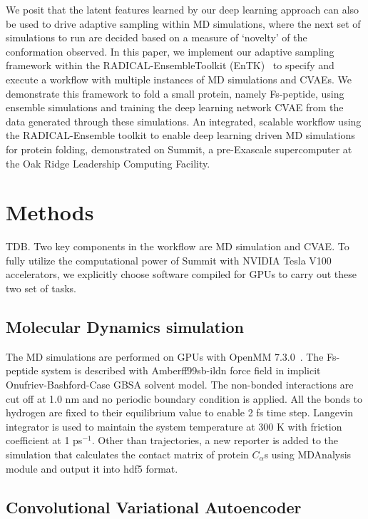 \documentclass[conference,final]{IEEEtran}
\begin{document}
We posit that the latent features learned by our deep learning approach can
also be used to drive adaptive sampling within MD simulations, where the next
set of simulations to run are decided based on a measure of ‘novelty’ of the
conformation observed. In this paper, we implement our adaptive sampling
framework within the RADICAL-EnsembleToolkit
(EnTK)~\cite{balasubramanian2018harnessing} to specify and execute a workflow
with multiple instances of MD simulations and CVAEs. We demonstrate this
framework to fold a small protein, namely Fs-peptide, using ensemble
simulations and training the deep learning network CVAE from the data
generated through these simulations. An integrated, scalable workflow using
the RADICAL-Ensemble toolkit to enable deep learning driven MD simulations
for protein folding, demonstrated on Summit, a pre-Exascale supercomputer at
the Oak Ridge Leadership Computing Facility.

\section{Methods} 

TDB\@. Two key components in the workflow are MD simulation and CVAE. 
To fully utilize the computational power of Summit with NVIDIA Tesla V100 
accelerators, we explicitly choose software compiled for GPUs to carry out 
these two set of tasks. 


\subsection{Molecular Dynamics simulation}

The MD simulations are performed on GPUs with OpenMM
7.3.0~\cite{eastman2017openmm}. The Fs-peptide system is described with 
Amberff99sb-ildn force field in implicit Onufriev-Bashford-Case GBSA solvent 
model. The non-bonded 
interactions are cut off at 1.0 nm and no periodic boundary condition is
applied. All the bonds to hydrogen are fixed to their equilibrium value to
enable 2 fs time step. Langevin integrator is used to maintain the system
temperature at 300 K with friction coefficient at 1 ps$^{-1}$. Other than
trajectories, a new reporter is added to the simulation that calculates the 
contact matrix of protein $C_{\alpha}$s using 
MDAnalysis~\cite{michaud2011mdanalysis,gowers2016mdanalysis} 
module and output it into hdf5 format. 

\subsection{Convolutional Variational Autoencoder}
\end{document}
